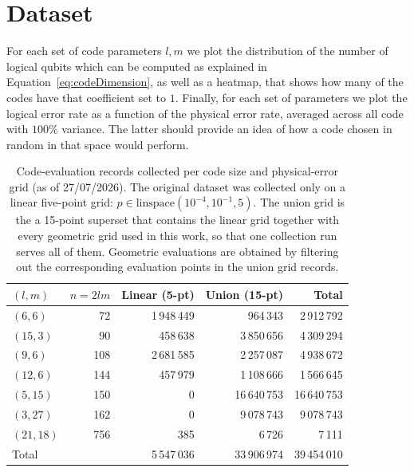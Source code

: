 \section{Dataset}
\label{appendix:dataset}
For each set of code parameters \(l,m\) we plot the distribution of the number of logical 
qubits which can be computed as explained in Equation~\ref{eq:codeDimension}, as well as a heatmap, that shows how many of the codes have that coefficient set to \(1\).
Finally, for each set of parameters we plot the logical error rate as a function of the physical error rate, averaged across all code with \(100\%\) variance. 
The latter should provide an idea of how a code chosen in random in that space would perform.

\begin{table}[h]
  \centering
  \caption{Code-evaluation records collected per code size and physical-error grid
    (as of 27/07/2026). The original dataset was collected only on 
    a linear five-point grid: \(p \in \mathrm{linspace}(10^{-4}, 10^{-1}, 5)\).
    The union grid is the a 15-point superset that contains the linear grid together with 
    every geometric grid used in this work, so that one collection run serves all of them. 
    Geometric evaluations are obtained by filtering out the corresponding evaluation points 
    in the union grid records.}
  \label{tab:recordCensus}
  \begin{tabular}{lrrrr}
    \toprule
    \((l,m)\) & \(n = 2lm\) & Linear (5-pt) & Union (15-pt) & Total \\
    \midrule
    \href{https://github.com/Omer-Sella/bbCodesDataset/tree/master/l_6_m_6}{\((6,6)\)}   & 72  & 1\,948\,449 &    964\,343 &  2\,912\,792 \\
    \href{https://github.com/Omer-Sella/bbCodesDataset/tree/master/l_15_m_3}{\((15,3)\)}  & 90  &    458\,638 & 3\,850\,656 &  4\,309\,294 \\
    \href{https://github.com/Omer-Sella/bbCodesDataset/tree/master/l_9_m_6}{\((9,6)\)}   & 108 & 2\,681\,585 & 2\,257\,087 &  4\,938\,672 \\
    \href{https://github.com/Omer-Sella/bbCodesDataset/tree/master/l_12_m_6}{\((12,6)\)}  & 144 &    457\,979 & 1\,108\,666 &  1\,566\,645 \\
    \href{https://github.com/Omer-Sella/bbCodesDataset/tree/master/l_5_m_15}{\((5,15)\)}  & 150 &           0 & 16\,640\,753 & 16\,640\,753 \\
    \href{https://github.com/Omer-Sella/bbCodesDataset/tree/master/l_3_m_27}{\((3,27)\)}  & 162 &           0 & 9\,078\,743 &  9\,078\,743 \\
    \href{https://github.com/Omer-Sella/bbCodesDataset/tree/master/l_21_m_18}{\((21,18)\)} & 756 &        385 &      6\,726 &       7\,111 \\
    \midrule
    Total       &     & 5\,547\,036 & 33\,906\,974 & 39\,454\,010 \\
    \bottomrule
  \end{tabular}
\end{table}


